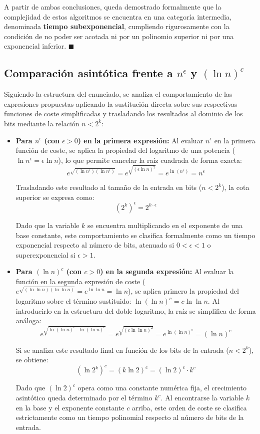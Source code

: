 \documentclass[11pt,a4paper,spanish]{book}
\begin{document}
A partir de ambas conclusiones, queda demostrado formalmente que la complejidad de estos algoritmos se encuentra en una categoría intermedia, denominada \textbf{tiempo subexponencial}, cumpliendo rigurosamente con la condición de no poder ser acotada ni por un polinomio superior ni por una exponencial inferior. $\blacksquare$

\subsection{Comparación asintótica frente a $n^{\epsilon}$ y $(\ln n)^c$}

Siguiendo la estructura del enunciado, se analiza el comportamiento de las expresiones propuestas aplicando la sustitución directa sobre sus respectivas funciones de coste simplificadas y trasladando los resultados al dominio de los bits mediante la relación $n < 2^k$:

\begin{itemize}
    \item \textbf{Para $n^{\epsilon}$ (con $\epsilon > 0$) en la primera expresión:} 
    Al evaluar $n^{\epsilon}$ en la primera función de coste, se aplica la propiedad del logaritmo de una potencia ($\ln n^{\epsilon} = \epsilon \ln n$), lo que permite cancelar la raíz cuadrada de forma exacta:
    $$e^{\sqrt{(\ln n^{\epsilon}) (\ln n^{\epsilon})}} = e^{\sqrt{(\epsilon \ln n)^2}} = e^{\ln(n^{\epsilon})} = n^{\epsilon}$$
    
    Trasladando este resultado al tamaño de la entrada en bits ($n < 2^k$), la cota superior se expresa como:
    $$(2^k)^{\epsilon} = 2^{k \cdot \epsilon}$$
    
    Dado que la variable $k$ se encuentra multiplicando en el exponente de una base constante, este comportamiento se clasifica formalmente como un tiempo exponencial respecto al número de bits, atenuado si $0 < \epsilon < 1$ o superexponencial si $\epsilon > 1$.

    \item \textbf{Para $(\ln n)^c$ (con $c > 0$) en la segunda expresión:} 
    Al evaluar la función en la segunda expresión de coste ($e^{\sqrt{(\ln \ln n)(\ln \ln n)}} = e^{\ln \ln n} = \ln n$), se aplica primero la propiedad del logaritmo sobre el término sustituido: $\ln(\ln n)^c = c \ln \ln n$. Al introducirlo en la estructura del doble logaritmo, la raíz se simplifica de forma análoga:
    $$e^{\sqrt{\ln(\ln n)^c \cdot \ln(\ln n)^c}} = e^{\sqrt{(c \ln \ln n)^2}} = e^{\ln(\ln n)^c} = (\ln n)^c$$
    
    Si se analiza este resultado final en función de los bits de la entrada ($n < 2^k$), se obtiene:
    $$(\ln 2^k)^c = (k \ln 2)^c = (\ln 2)^c \cdot k^c$$
    
    Dado que $(\ln 2)^c$ opera como una constante numérica fija, el crecimiento asintótico queda determinado por el término $k^c$. Al encontrarse la variable $k$ en la base y el exponente constante $c$ arriba, este orden de coste se clasifica estrictamente como un tiempo polinomial respecto al número de bits de la entrada.
\end{itemize}
\end{document}
